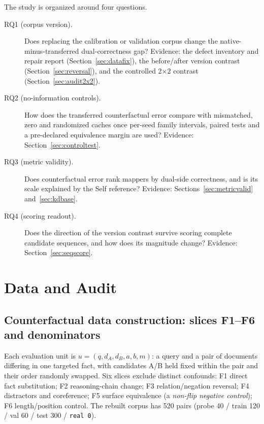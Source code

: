 \documentclass[11pt,twocolumn]{article}
\begin{document}
The study is organized around four questions.

\begin{description}
\item[RQ1 (corpus version).] Does replacing the calibration or validation
      corpus change the native-minus-transferred dual-correctness gap?
      Evidence: the defect inventory and repair report
      (Section~\ref{sec:datafix}), the before/after version contrast
      (Section~\ref{sec:reversal}), and the controlled 2$\times$2 contrast
      (Section~\ref{sec:audit2x2}).
\item[RQ2 (no-information controls).] How does the transferred counterfactual
      error compare with mismatched, zero and randomized caches once
      per-seed family intervals, paired tests and a pre-declared equivalence
      margin are used? Evidence: Section~\ref{sec:controltest}.
\item[RQ3 (metric validity).] Does counterfactual error rank mappers by
      dual-side correctness, and is its scale explained by the Self reference?
      Evidence: Sections~\ref{sec:metricvalid} and~\ref{sec:kdbase}.
\item[RQ4 (scoring readout).] Does the direction of the version contrast
      survive scoring complete candidate sequences, and how does its magnitude
      change? Evidence: Section~\ref{sec:seqscore}.
\end{description}

\section{Data and Audit}
\label{sec:dataaudit}

\subsection{Counterfactual data construction: slices F1--F6 and denominators}
\label{sec:data}

Each evaluation unit is $u=(q,d_A,d_B,a,b,m)$: a query and a pair of documents
differing in one targeted fact, with candidates A/B held fixed within the pair
and their order randomly swapped. Six slices exclude distinct confounds:
F1 direct fact substitution; F2 reasoning-chain change; F3 relation/negation
reversal; F4 distractors and coreference; F5 surface equivalence (a
\emph{non-flip negative control}); F6 length/position control. The rebuilt
corpus has 520 pairs (probe 40 / train 120 / val 60 / test 300 / \texttt{real 0}).
\end{document}
